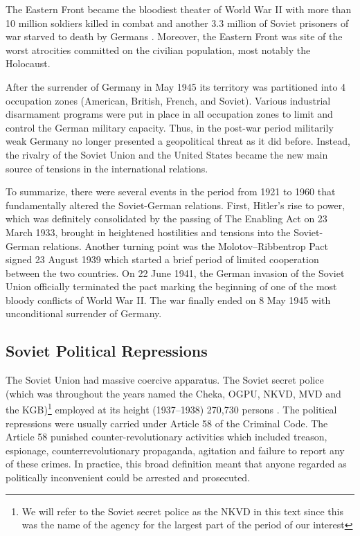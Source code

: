 The Eastern Front became the bloodiest theater of World War II with more than 10 million soldiers killed in combat and another 3.3 million of Soviet prisoners of war starved to death  by Germans \citep[p. 155]{snyder_bloodlands:_2011}. Moreover, the Eastern Front was site of the worst atrocities committed on the civilian population, most notably the Holocaust. 

After the surrender of Germany in May 1945 its territory was partitioned into 4 occupation zones (American, British, French, and Soviet).  Various industrial disarmament programs were put in place in all occupation zones to limit and control the German military capacity. Thus, in the post-war period militarily weak Germany no longer presented a geopolitical threat as it did before.
Instead,  the rivalry  of the Soviet Union and the United States became  the new main source of tensions in the international relations. 

To summarize, there were several events in the period from 1921 to 1960 that fundamentally  altered the Soviet-German relations. First,  Hitler's rise to power, which was definitely consolidated by the passing of The Enabling Act on 23 March 1933, brought in heightened hostilities and tensions into the Soviet-German relations.
Another turning point was the Molotov–Ribbentrop Pact signed 23 August 1939 which started a brief period of limited cooperation between the two countries. 
On 22 June 1941, the German invasion of the Soviet Union officially terminated the pact  marking the beginning of one of the most bloody conflicts of World War II. 
 The war finally ended on  8 May 1945  with unconditional surrender of Germany. 
\subsection{Soviet Political Repressions}
The Soviet Union had massive coercive apparatus. The Soviet secret police (which was throughout the years named the Cheka, OGPU, NKVD, MVD and  the KGB)\footnote{We will refer to the Soviet secret police as the NKVD in this text since this was the name of the agency for the largest part of the period of our interest} employed at its height (1937–1938)  270,730 persons \citep[p. 2]{gregory_terror_2009}. 
The political repressions were usually carried under Article 58 of the Criminal Code. The Article 58 punished counter-revolutionary activities 
which included treason, espionage, counterrevolutionary propaganda, agitation and  failure to report any of these crimes.  
In practice, this broad definition meant that anyone regarded as politically inconvenient could be arrested and prosecuted. 

